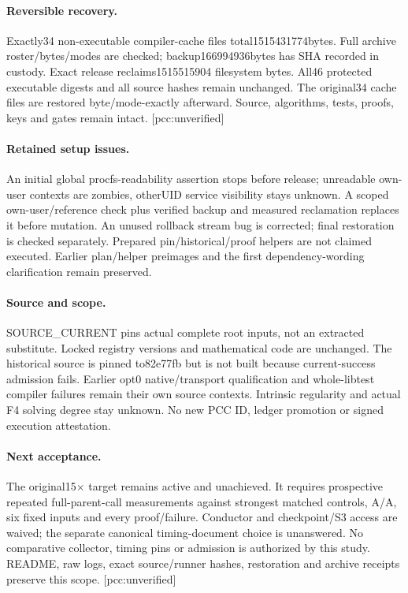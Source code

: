 \documentclass[10pt,a4paper]{article}
\begin{document}
\paragraph{Reversible recovery.} Exactly34 non-executable compiler-cache files total1515431774bytes. Full archive roster/bytes/modes are checked; backup166994936bytes has SHA recorded in custody. Exact release reclaims1515515904 filesystem bytes. All46 protected executable digests and all source hashes remain unchanged. The original34 cache files are restored byte/mode-exactly afterward. Source, algorithms, tests, proofs, keys and gates remain intact. [pcc:unverified]
\paragraph{Retained setup issues.} An initial global procfs-readability assertion stops before release; unreadable own-user contexts are zombies, otherUID service visibility stays unknown. A scoped own-user/reference check plus verified backup and measured reclamation replaces it before mutation. An unused rollback stream bug is corrected; final restoration is checked separately. Prepared pin/historical/proof helpers are not claimed executed. Earlier plan/helper preimages and the first dependency-wording clarification remain preserved.
\paragraph{Source and scope.} SOURCE\_CURRENT pins actual complete root inputs, not an extracted substitute. Locked registry versions and mathematical code are unchanged. The historical source is pinned to82e77fb but is not built because current-success admission fails. Earlier opt0 native/transport qualification and whole-libtest compiler failures remain their own source contexts. Intrinsic regularity and actual F4 solving degree stay unknown. No new PCC ID, ledger promotion or signed execution attestation.
\paragraph{Next acceptance.} The original15$\times$ target remains active and unachieved. It requires prospective repeated full-parent-call measurements against strongest matched controls, A/A, six fixed inputs and every proof/failure. Conductor and checkpoint/S3 access are waived; the separate canonical timing-document choice is unanswered. No comparative collector, timing pins or admission is authorized by this study. README, raw logs, exact source/runner hashes, restoration and archive receipts preserve this scope. [pcc:unverified]
\end{document}
